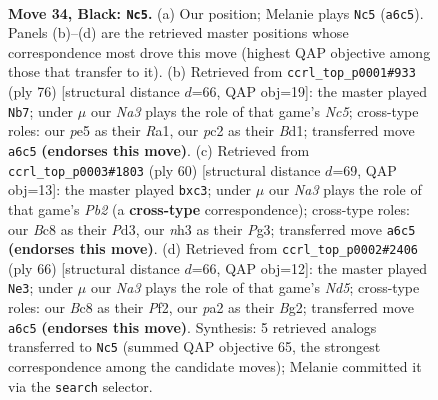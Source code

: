 \documentclass[11pt]{article}
\begin{document}
\clearpage

\begin{figure}[p]\centering
\begin{subfigure}{0.46\textwidth}\centering
\resizebox{\linewidth}{!}{%
\newchessgame
\chessboard[
  setfen={2b1r1k1/5p1p/n1q3p1/4Pp2/p4P2/3B3N/PQP2KPP/6R1 b - - 5 34},
  showmover=false,
  pgfstyle=straightmove, color=movearrow, markmove={a6-c5}
]}
\caption{}
\end{subfigure}\hfill
\begin{subfigure}{0.46\textwidth}\centering
\resizebox{\linewidth}{!}{%
\newchessgame
\chessboard[
  setfen={2rq2k1/5pp1/p7/pbNp4/1n1P2Pp/4P2P/3Q1P2/R2B2K1 w - - 9 39},
  showmover=false,
  pgfstyle=straightmove, color=movearrow, markmove={c5-b7}
]}
\caption{}
\end{subfigure}
\\[4pt]
\begin{subfigure}{0.46\textwidth}\centering
\resizebox{\linewidth}{!}{%
\newchessgame
\chessboard[
  setfen={1r4k1/3qpp2/2np2p1/2p5/2P1PN2/2bP2P1/1P3Q1P/5R1K w - - 0 31},
  showmover=false,
  pgfstyle=straightmove, color=movearrow, markmove={b2-c3}
]}
\caption{}
\end{subfigure}\hfill
\begin{subfigure}{0.46\textwidth}\centering
\resizebox{\linewidth}{!}{%
\newchessgame
\chessboard[
  setfen={1r1q2k1/5pp1/p2pb1np/1p1N4/1P6/P5P1/3Q1PBP/3R2K1 w - - 6 34},
  showmover=false,
  pgfstyle=straightmove, color=movearrow, markmove={d5-e3}
]}
\caption{}
\end{subfigure}
\caption{\textbf{Move 34, Black: \texttt{Nc5}.} (a) Our position; Melanie plays \texttt{Nc5} (\texttt{a6c5}). Panels (b)--(d) are the retrieved master positions whose correspondence most drove this move (highest QAP objective among those that transfer to it). (b) Retrieved from \texttt{ccrl\_top\_p0001\#933} (ply 76) [structural distance $d$=66, QAP obj=19]: the master played \texttt{Nb7}; under $\mu$ our \emph{Na3} plays the role of that game's \emph{Nc5}; cross-type roles: our \emph{p}e5 as their \emph{R}a1, our \emph{p}c2 as their \emph{B}d1; transferred move \texttt{a6c5} \textbf{(endorses this move)}. (c) Retrieved from \texttt{ccrl\_top\_p0003\#1803} (ply 60) [structural distance $d$=69, QAP obj=13]: the master played \texttt{bxc3}; under $\mu$ our \emph{Na3} plays the role of that game's \emph{Pb2} (a \textbf{cross-type} correspondence); cross-type roles: our \emph{B}c8 as their \emph{P}d3, our \emph{n}h3 as their \emph{P}g3; transferred move \texttt{a6c5} \textbf{(endorses this move)}. (d) Retrieved from \texttt{ccrl\_top\_p0002\#2406} (ply 66) [structural distance $d$=66, QAP obj=12]: the master played \texttt{Ne3}; under $\mu$ our \emph{Na3} plays the role of that game's \emph{Nd5}; cross-type roles: our \emph{B}c8 as their \emph{P}f2, our \emph{p}a2 as their \emph{B}g2; transferred move \texttt{a6c5} \textbf{(endorses this move)}. Synthesis: 5 retrieved analogs transferred to \texttt{Nc5} (summed QAP objective 65, the strongest correspondence among the candidate moves); Melanie committed it via the \texttt{search} selector.}
\label{fig:thought-m67}
\end{figure}
\end{document}
